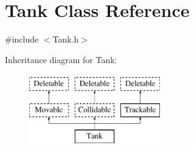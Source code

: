 \hypertarget{classTank}{\section{Tank Class Reference}
\label{classTank}
}


{\ttfamily \#include $<$Tank.\-h$>$}

Inheritance diagram for Tank\-:\begin{figure}[H]
\begin{center}
\leavevmode
\includegraphics[height=3.000000cm]{classTank}
\end{center}
\end{figure}
